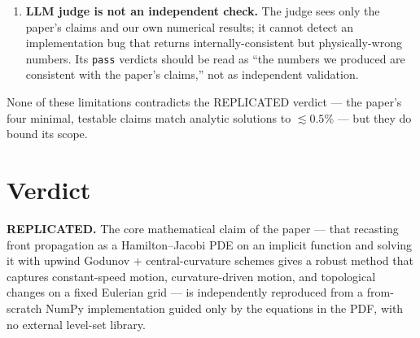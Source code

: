 \documentclass[11pt]{article}
\begin{document}
\begin{enumerate}
\item \textbf{LLM judge is not an independent check.} The judge sees
only the paper's claims and our own numerical results; it cannot
detect an implementation bug that returns internally-consistent but
physically-wrong numbers. Its \texttt{pass} verdicts should be read as
``the numbers we produced are consistent with the paper's claims,''
not as independent validation.
\end{enumerate}

None of these limitations contradicts the REPLICATED verdict --- the
paper's four minimal, testable claims match analytic solutions to
$\lesssim 0.5\%$ --- but they do bound its scope.

\section{Verdict}
\textbf{REPLICATED.} The core mathematical claim of the paper --- that
recasting front propagation as a Hamilton--Jacobi PDE on an implicit
function and solving it with upwind Godunov + central-curvature schemes
gives a robust method that captures constant-speed motion,
curvature-driven motion, and topological changes on a fixed Eulerian
grid --- is independently reproduced from a from-scratch NumPy
implementation guided only by the equations in the PDF, with no
external level-set library.
\end{document}
